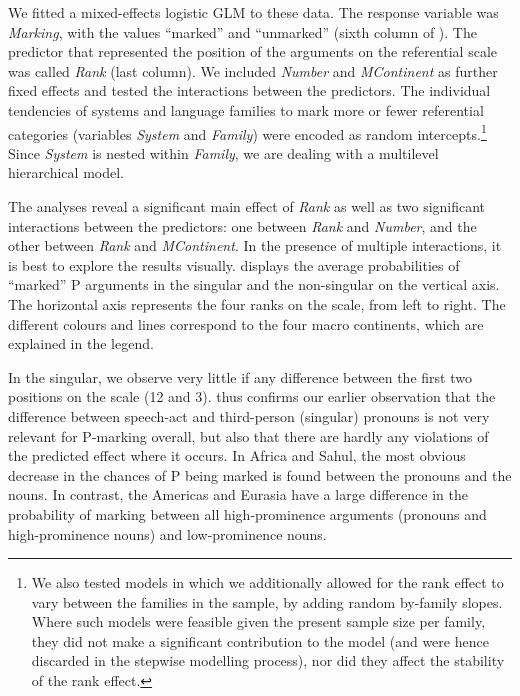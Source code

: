 \documentclass[output=paper]{langscibook}
\begin{document}
We fitted a mixed-effects logistic GLM to these data. The response variable was \textit{Marking}, with the values “marked” and “unmarked” (sixth column of ). The predictor that represented the position of the arguments on the referential scale was called \textit{Rank} (last column). We included \textit{Number} and \textit{MContinent} as further fixed effects and tested the interactions between the predictors. The individual tendencies of systems and language families to mark more or fewer referential categories (variables \textit{System} and \textit{Family}) were encoded as random intercepts.\footnote{We also tested models in which we additionally allowed for the rank effect to vary between the families in the sample, \ie by adding random by-family slopes. Where such models were feasible given the present sample size per family, they did not make a significant contribution to the model (and were hence discarded in the stepwise modelling process), nor did they affect the stability of the rank effect.} Since \textit{System} is nested within \textit{Family}, we are dealing with a multilevel hierarchical model.

The analyses reveal a significant main effect of \textit{Rank} as well as two significant interactions between the predictors: one between \textit{Rank} and \textit{Number}, and the other between \textit{Rank} and \textit{MContinent}. In the presence of multiple interactions, it is best to explore the results visually.  displays the average probabilities of “marked” P arguments in the singular and the non-singular on the vertical axis. The horizontal axis represents the four ranks on the scale, from left to right. The different colours and lines correspond to the four macro continents, which are explained in the legend.

In the singular, we observe very little if any difference between the first two positions on the scale (12 and 3).  thus confirms our earlier observation that the difference between speech-act and third-person (singular) pronouns is not very relevant for P-marking overall, but also that there are hardly any violations of the predicted effect where it occurs. In Africa and Sahul, the most obvious decrease in the chances of P being marked is found between the pronouns and the nouns. In contrast, the Americas and Eurasia have a large difference in the probability of marking between all high-prominence arguments (pronouns and high-prominence nouns) and low-prominence nouns.
\end{document}
